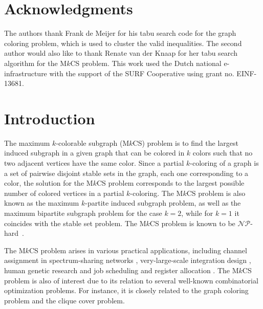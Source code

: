 \documentclass[11pt, a4paper]{article}
\newcommand{\mc}{\mathcal}
\begin{document}
\section*{Acknowledgments}
The authors thank Frank de Meijer for his tabu search code for the graph coloring problem, which is used to cluster the valid inequalities.
The second author would also like to thank Renate van der Knaap for her tabu search algorithm for the M$k$CS problem. 
This work used the Dutch national e-infrastructure with the support of the SURF Cooperative using grant no. EINF-13681.

\section{Introduction}
The maximum $k$-colorable subgraph (M$k$CS) problem is to find the largest induced subgraph in a given graph that can be colored in $k$ colors such that no two adjacent vertices have the same color.
Since a partial $k$-coloring of a graph is a set of pairwise disjoint stable sets in the graph, each one corresponding to a color, the solution for the M$k$CS problem corresponds to the largest possible number of colored vertices in a partial $k$-coloring.
The M$k$CS problem is also known as the maximum $k$-partite induced subgraph problem, as well as the maximum bipartite subgraph problem for the case $k=2$, while for  $k=1$ it coincides with the stable set problem.  
The M$k$CS problem is known to be $\mc{NP}$-hard~\citep{Lewis1980NPHardness}.

The M$k$CS problem arises in various practical applications, including channel assignment in spectrum-sharing networks
\citep{ApplicationChannelAssignment5, ApplicationChannelAssignment1, ApplicationChannelAssignment4, ApplicationChannelAssignment3, ApplicationChannelAssignment2}, very-large-scale integration design \citep{ApplicationVLSI2, ApplicationVLSI1}, human genetic research \citep{ApplicationVLSI2, ApplicationGenetics} and job scheduling and register allocation \citep{ApplicationJobScheduling}. 
The M$k$CS problem is also of interest due to its relation to several well-known combinatorial optimization problems. For instance, it is closely related to the graph coloring problem and the clique cover problem.
\end{document}
